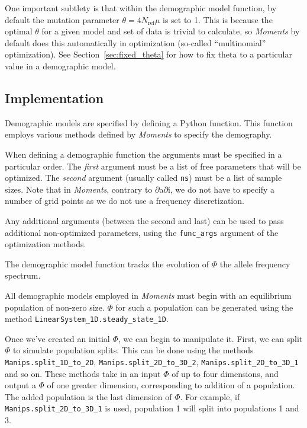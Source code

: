 \documentclass[12pt]{article}
\makeatletter
\newcommand{\dadi}{$\partial$a$\partial$i\xspace}
\newcommand{\Nref}{\ensuremath{N_\text{ref}}\xspace}
\newcommand{\py}[1]{\lstinline[breaklines=true,language=Python, showstringspaces=False]@#1@}
\makeatother
\begin{document}
One important subtlety is that within the demographic model function, by default the mutation parameter $\theta = 4 \Nref \mu$ is set to 1.
This is because the optimal $\theta$ for a given model and set of data is trivial to calculate, so \textit{Moments} by default does this automatically in optimization (so-called ``multinomial'' optimization).
See Section~\ref{sec:fixed_theta} for how to fix theta to a particular value in a demographic model.

\subsection{Implementation}

Demographic models are specified by defining a Python function.
This function employs various methods defined by \textit{Moments} to specify the demography.

When defining a demographic function the arguments must be specified in a particular order.
The \emph{first} argument must be a list of free parameters that will be optimized.
The \emph{second} argument (usually called \py{ns}) must be a list of sample sizes.
Note that in \textit{Moments}, contrary to \dadi, we do not have to specify a number of grid points as we do not use a frequency discretization. 

Any additional arguments (between the second and last) can be used to pass additional non-optimized parameters, using the \py{func_args} argument of the optimization methods.

The demographic model function tracks the evolution of $\Phi$ the allele frequency spectrum.

All demographic models employed in \textit{Moments} must begin with an equilibrium population of non-zero size.
$\Phi$ for such a population can be generated using the method \py{LinearSystem_1D.steady_state_1D}.

Once we've created an initial $\Phi$, we can begin to manipulate it.
First, we can split $\Phi$ to simulate population splits.
This can be done using the methods \py{Manips.split_1D_to_2D}, \py{Manips.split_2D_to_3D_2}, \py{Manips.split_2D_to_3D_1} and so on.
These methods take in an input $\Phi$ of up to four dimensions, and output a $\Phi$ of one greater dimension, corresponding to addition of a population.
The added population is the last dimension of $\Phi$.
For example, if \py{Manips.split_2D_to_3D_1} is used, population 1 will split into populations 1 and 3.
\end{document}
